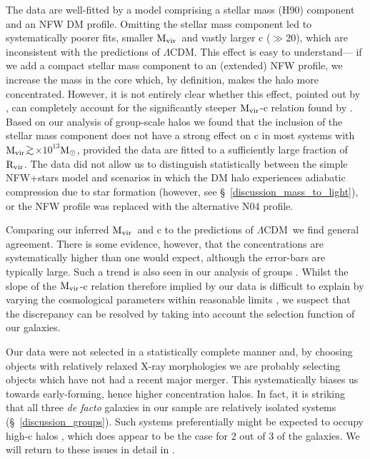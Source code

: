 \documentclass{emulateapj}
\def\spose#1{\hbox to 0pt{#1\hss}}
\def\gtsim{$\mathrel{\spose{\lower 3pt\hbox{$\sim$}} 
        \raise 2.0pt\hbox{$>$}}$\thinspace}
\def \msun {${\rm M_\odot}$}
\newcommand{\mvir}{${\rm M_{vir}}$}
\newcommand{\lcdm}{$\Lambda$CDM}
\newcommand{\rvir }{${\rm R_{vir}}$}
\begin{document}
The data are well-fitted by a model comprising a stellar
mass (H90) component and an NFW DM profile. 
Omitting the stellar 
mass component led to systematically poorer fits, smaller
\mvir\ and vastly larger c ($\gg$20), which are inconsistent with
the predictions of \lcdm. This effect is easy to understand--- if
we add a compact stellar mass component to an (extended) NFW profile,
we increase the mass in the core which, by definition, makes the
halo more concentrated.
However, it is not entirely clear whether this
effect, pointed out by \citet{mamon05a},
can completely account for the significantly steeper
\mvir-c relation found by \citet{sato00a}.
Based on our analysis of group-scale halos \citep{gastaldello06a}
we found that the inclusion of the stellar mass component 
does not have a strong effect on c in most systems with 
\mvir \gtsim 2$\times 10^{13}$\msun,
provided the data are fitted to
a sufficiently large fraction of \rvir.
The data did not allow us to distinguish statistically between
the simple NFW+stars model and 
scenarios in which the DM halo experiences adiabatic compression
due to star formation (however, see \S~\ref{discussion_mass_to_light}),
or the NFW profile was replaced with the alternative N04 profile.

Comparing our inferred \mvir\ and c  to the predictions of \lcdm\
we find general agreement. There is some evidence, however, that
the concentrations are systematically higher than one would 
expect, although the error-bars are typically large. 
Such a trend is also seen in our analysis of groups
\citep{gastaldello06a}. Whilst the slope  of the \mvir-c relation
therefore implied by our data is difficult to explain by varying the 
cosmological parameters within reasonable limits \citep{buote06b},
we suspect that the discrepancy can be resolved by taking into
account the selection function of our galaxies. 

Our
data were not selected in a statistically complete manner and, by choosing
objects with relatively relaxed X-ray morphologies we are probably
selecting objects which have not had a recent major merger.
This systematically biases us towards early-forming, hence higher
concentration halos. 
In fact, it is striking that all three {\em de facto} galaxies
in our sample are relatively isolated systems (\S~\ref{discussion_groups}).
Such systems preferentially might be expected to occupy high-c 
halos \citep{zentner05a},
which does appear to be the case for 2 out of 3 of the galaxies.
We will return to these issues in detail in \citet{buote06b}.
\end{document}
